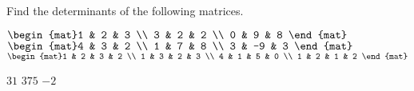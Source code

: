 
\begin{Exercise}[
name={},
title={}, 
difficulty=0,
origin={\cite{KK}}]
Find the determinants of the following matrices.
\begin{multicols}{2}
\Question $\begin{mat}1 & 2 & 3 \\
3 & 2 & 2 \\
0 & 9 & 8
\end{mat}$
\Question $\begin{mat}4 & 3 & 2 \\
1 & 7 & 8 \\
3 & -9 & 3
\end{mat}$
\Question $\begin{mat}1 & 2 & 3 & 2 \\
1 & 3 & 2 & 3 \\
4 & 1 & 5 & 0 \\
1 & 2 & 1 & 2
\end{mat}$
\EndCurrentQuestion
\end{multicols}

\end{Exercise}
\begin{Answer}
\Question $31$
\Question $375$
\Question $-2$
\end{Answer}
